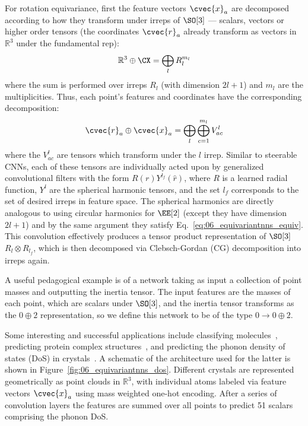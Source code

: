 For rotation equivariance, first the feature vectors $\cvec{x}_a$ are decomposed according to how they transform under irreps of $\SO[3]$ --- scalars, vectors or higher order tensors (the coordinates $\cvec{r}_a$ already transform as vectors in $\mathbb R^3$ under the fundamental rep):
\begin{equation}
    \mathbb R^3 \oplus \CX = \bigoplus _l R_l^{m_l}
\end{equation}
where the sum is performed over irreps $R_l$ (with dimension $2l+1$) and $m_l$ are the multiplicities.
Thus, each point's features and coordinates have the corresponding decomposition:
\begin{equation}
    \cvec{r}_a \oplus \cvec{x}_a = \bigoplus _l \bigoplus _{c=1}^{m_l} V^l_{ac}
\end{equation}
where the $V^l_{ac}$ are tensors which transform under the $l$ irrep.
Similar to steerable CNNs, each of these tensors are individually acted upon by generalized convolutional filters with the form $R(r)Y^{l_f}(\hat{r})$, where $R$ is a learned radial function, $Y^l$ are the spherical harmonic tensors, and the set $l_f$ corresponds to the set of desired irreps in feature space. The spherical harmonics are directly analogous to using circular harmonics for $\EE[2]$ (except they have dimension $2l+1$) and by the same argument they satisfy Eq.~\ref{eq:06_equivariantnns_equiv}.
This convolution effectively produces a tensor product representation of $\SO[3]$ $R_{l} \otimes R_{l_f}$, which is then decomposed via Clebsch-Gordan (CG) decomposition into irreps again.

A useful pedagogical example is of a network taking as input a collection of point masses and outputting the inertia tensor.
The input features are the masses of each point, which are scalars under $\SO[3]$, and the inertia tensor transforms as the $0 \oplus 2$ representation, so we define this network to be of the type $0 \rightarrow 0 \oplus 2$.

Some interesting and successful applications include classifying molecules~\cite{miller2020relevance}, predicting protein complex structures~\cite{Eismann2020HierarchicalRN}, and predicting the phonon density of states (DoS) in crystals~\cite{chen2020direct}.
A schematic of the architecture used for the latter is shown in Figure~\ref{fig:06_equivariantnns_dos}.
Different crystals are represented geometrically as point clouds in $\mathbb R^3$, with individual atoms labeled via feature vectors $\cvec{x}_a$ using mass weighted one-hot encoding.
After a series of convolution layers the features are summed over all points to predict 51 scalars comprising the phonon DoS.


